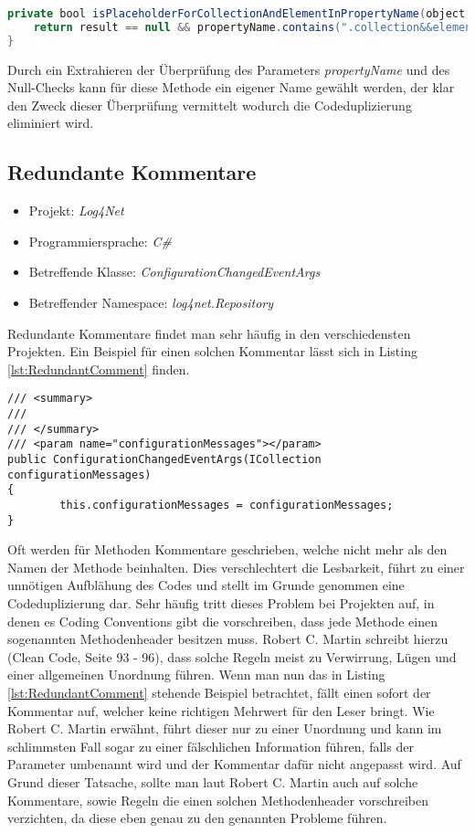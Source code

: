 \begin{lstlisting}[language=Java, caption=Boolscher Ausdruck neu, label=lst:BoolStatement4]
private bool isPlaceholderForCollectionAndElementInPropertyName(object result, String propertyName) {
	return result == null && propertyName.contains(".collection&&element.");
}
\end{lstlisting}

\SuperPar Durch ein Extrahieren der Überprüfung des Parameters \textit{propertyName} und des Null-Checks kann für diese Methode ein eigener Name gewählt werden, der klar den Zweck dieser Überprüfung vermittelt wodurch die Codeduplizierung eliminiert wird. 

\subsection{Redundante Kommentare}
\begin{itemize}
	\item Projekt: \textit{Log4Net}
	\item Programmiersprache: \textit{C\#}
	\item Betreffende Klasse: \textit{ConfigurationChangedEventArgs}
	\item Betreffender Namespace: \textit{log4net.Repository}
\end{itemize}

\SuperPar Redundante Kommentare findet man sehr häufig in den verschiedensten Projekten. Ein Beispiel für einen solchen Kommentar lässt sich in Listing \ref{lst:RedundantComment}  finden.


\begin{lstlisting}[language={[Sharp]C}, caption=Beispiele für überflüssige Kommentare, label=lst:RedundantComment]
/// <summary>
/// 
/// </summary>
/// <param name="configurationMessages"></param>
public ConfigurationChangedEventArgs(ICollection configurationMessages)
{
		this.configurationMessages = configurationMessages;
}
\end{lstlisting}

\SuperPar Oft werden für Methoden Kommentare geschrieben, welche nicht mehr als den Namen der Methode beinhalten. Dies verschlechtert die Lesbarkeit, führt zu einer unnötigen Aufblähung des Codes und stellt im Grunde genommen eine Codeduplizierung dar. Sehr häufig tritt dieses Problem bei Projekten auf, in denen es Coding Conventions gibt die vorschreiben, dass jede Methode einen sogenannten Methodenheader besitzen muss. Robert C. Martin schreibt hierzu (Clean Code, Seite 93 - 96), dass solche Regeln meist zu Verwirrung, Lügen und einer allgemeinen Unordnung führen.  Wenn man nun das in Listing \ref{lst:RedundantComment} stehende Beispiel betrachtet, fällt einen sofort der Kommentar auf, welcher keine richtigen Mehrwert für den Leser bringt. Wie Robert C. Martin erwähnt, führt dieser nur zu einer Unordnung und kann im schlimmsten Fall sogar zu einer fälschlichen Information führen, falls der Parameter umbenannt wird und der Kommentar dafür nicht angepasst wird. Auf Grund dieser Tatsache, sollte man laut Robert C. Martin auch auf solche Kommentare, sowie Regeln die einen solchen Methodenheader vorschreiben verzichten, da diese eben genau zu den genannten Probleme führen.

